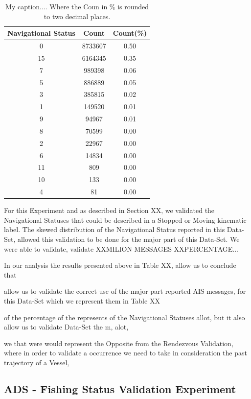 \begin{table}[H]
\centering
\caption{My caption.... Where the Coun in \% is rounded to two decimal places.}
\label{my-label}
\begin{tabular}{@{}ccc@{}}
\toprule
Navigational Status & \multicolumn{1}{c}{Count} & Count(\%) \\ \midrule
0 & 8733607 & 0.50 \\
15 & 6164345 & 0.35 \\
7 & 989398 & 0.06 \\
5 & 886889 & 0.05 \\
3 & 385815 & 0.02 \\
1 & 149520 & 0.01 \\
9 & 94967 & 0.01 \\
8 & 70599 & 0.00 \\
2 & 22967 & 0.00 \\
6 & 14834 & 0.00 \\
11 & 809 & 0.00 \\
10 & 133 & 0.00 \\
4 & 81 & 0.00 \\ \bottomrule
\end{tabular}
\end{table}

 For this Experiment and as described in Section XX, we validated the Navigational Statuses that could be described in a Stopped or Moving kinematic label.  The skewed distribution of the Navigational Status reported in this Data-Set, allowed this validation to be done for the major part of this Data-Set. We were able to validate, validate XXMILION MESSAGES XXPERCENTAGE...
  
 
 In our analysis the results presented above in Table XX, allow us to conclude that 
 
 
 allow us to validate the correct use of the major part reported AIS messages, for this Data-Set
 which we represent them in Table XX
 
 
 of the percentage of the represents of the Navigational Statuses allot, but it also allow us to validate Data-Set the m,  alot, 




we that were would represent the 
Opposite from the Rendezvous Validation, where in order to validate a occurrence we need to take in consideration the past trajectory of a Vessel, 

\subsection{ADS - Fishing Status Validation Experiment}







